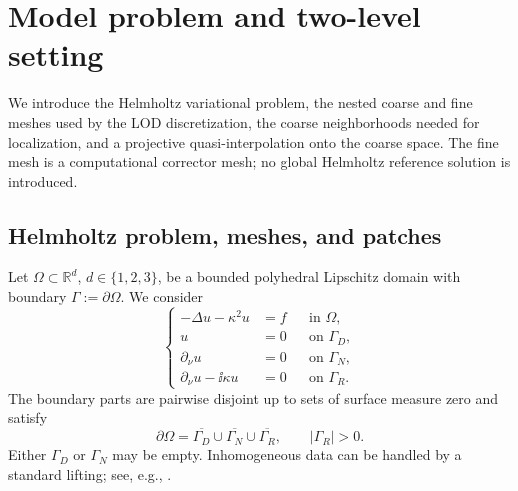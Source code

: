 \section{Model problem and two-level setting}
\label{sec:model-spaces}

We introduce the Helmholtz variational problem, the nested coarse and fine
meshes used by the LOD discretization, the coarse neighborhoods needed for
localization, and a projective quasi-interpolation onto the coarse space.
The fine mesh is a computational corrector mesh; no global Helmholtz
reference solution is introduced.

\subsection{Helmholtz problem, meshes, and patches}
\label{sec:meshes-patches}

Let $\Omega\subset\mathbb R^d$, $d\in\{1,2,3\}$, be a bounded
polyhedral Lipschitz domain with boundary $\Gamma:=\partial\Omega$.
We consider
\begin{equation}
\label{eq:strong-problem}
\left\{
\begin{aligned}
  -\Delta u-\kappa^2u &= f
    && \text{in }\Omega,\\
  u &= 0
    && \text{on }\Gamma_D,\\
  \partial_\nu u &= 0
    && \text{on }\Gamma_N,\\
  \partial_\nu u-\ii\kappa u &= 0
    && \text{on }\Gamma_R.
\end{aligned}
\right.
\end{equation}
The boundary parts are pairwise disjoint up to sets of surface measure
zero and satisfy
\[
  \partial\Omega
  =\overline{\Gamma_D}\cup\overline{\Gamma_N}
   \cup\overline{\Gamma_R},
  \qquad |\Gamma_R|>0.
\]
Either $\Gamma_D$ or $\Gamma_N$ may be empty.  Inhomogeneous data can be
handled by a standard lifting; see, e.g.,
\cite[Chapter~5]{MalqvistPeterseim2020}.

